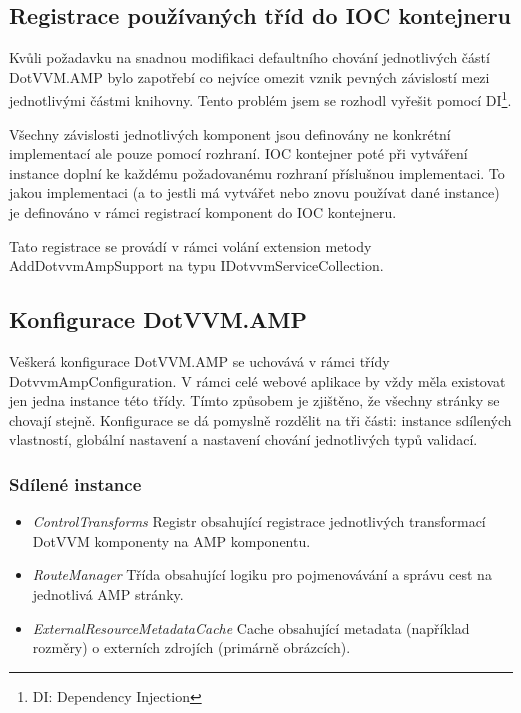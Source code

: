 \subsection*{Registrace používaných tříd do IOC kontejneru}

Kvůli požadavku na snadnou modifikaci defaultního chování jednotlivých částí DotVVM.AMP bylo zapotřebí co nejvíce omezit vznik pevných závislostí mezi jednotlivými částmi knihovny. Tento problém jsem se rozhodl vyřešit pomocí DI\footnote{\label{DI}DI: Dependency Injection}.

Všechny závislosti jednotlivých komponent jsou definovány ne konkrétní implementací ale pouze pomocí rozhraní. IOC kontejner poté při vytváření instance doplní ke každému požadovanému rozhraní příslušnou implementaci. To jakou implementaci (a to jestli má vytvářet nebo znovu používat dané instance) je definováno v rámci registrací komponent do IOC kontejneru.

Tato registrace se provádí v rámci volání extension metody AddDotvvmAmpSupport na typu IDotvvmServiceCollection.

\subsection*{Konfigurace DotVVM.AMP}
Veškerá konfigurace DotVVM.AMP se uchovává v rámci třídy DotvvmAmpConfiguration. V rámci celé webové aplikace by vždy měla existovat jen jedna instance této třídy. Tímto způsobem je zjištěno, že všechny stránky se chovají stejně. Konfigurace se dá pomyslně rozdělit na tři části: instance sdílených vlastností, globální nastavení a nastavení chování jednotlivých typů validací.

\subsubsection{Sdílené instance}
\begin{itemize}
    \item \textit{ControlTransforms} \newline
Registr obsahující registrace jednotlivých transformací DotVVM komponenty na AMP komponentu.
    \item \textit{RouteManager}\newline
Třída obsahující logiku pro pojmenovávání a správu cest na jednotlivá AMP stránky.
    \item \textit{ExternalResourceMetadataCache}\newline
Cache obsahující metadata (například rozměry) o externích zdrojích (primárně obrázcích).
\end{itemize}

